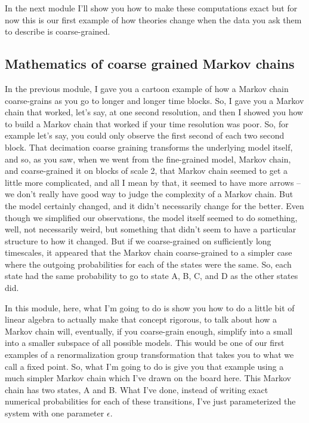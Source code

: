 \documentclass[]{article}
\begin{document}
In the next module
I'll show you how to make
these computations exact
but for now this is our first
example of how theories change when the
data you ask them to describe is
coarse-grained.

\subsection{Mathematics of coarse grained Markov chains}

In the previous module,
I gave you a cartoon example
of how a Markov chain coarse-grains
as you go to longer
and longer time blocks.
So, I gave you a Markov chain
that worked, let’s say,
at one second resolution,
and then I showed you
how to build a Markov chain
that worked if your time
resolution was poor.
So, for example let’s say,
you could only observe the first second
of each two second block.
That decimation coarse graining
transforms the underlying model itself,
and so, as you saw,
when we went from the fine-grained model,
Markov chain,
and coarse-grained it
on blocks of scale 2,
that Markov chain seemed to get
a little more complicated,
and all I mean by that,
it seemed to have more arrows –
we don’t really have good way
to judge the complexity of a Markov chain.
But the model certainly changed,
and it didn't necessarily
change for the better.
Even though we simplified
our observations,
the model itself seemed to do something,
well, not necessarily weird,
but something that didn't seem to have
a particular structure to how it changed.
But if we coarse-grained
on sufficiently long timescales,
it appeared that the Markov chain
coarse-grained to a simpler case
where the outgoing probabilities
for each of the states were the same.
So, each state had the same probability
to go to state A, B, C, and D
as the other states did.

In this module, here, what I’m going to do
is show you how to do
a little bit of linear algebra
to actually make that concept rigorous,
to talk about how a Markov
chain will, eventually,
if you coarse-grain enough,
simplify into a small into a smaller
subspace of all possible models.
This would be one of our first examples
of a renormalization group transformation
that takes you
to what we call a fixed point.
So, what I’m going to do
is give you that example
using a much simpler Markov chain
which I’ve drawn on the board here.
This Markov chain has two states, A and B.
What I’ve done,
instead of writing
exact numerical probabilities
for each of these transitions,
I’ve just parameterized the system
with one parameter $\epsilon$.
\end{document}
